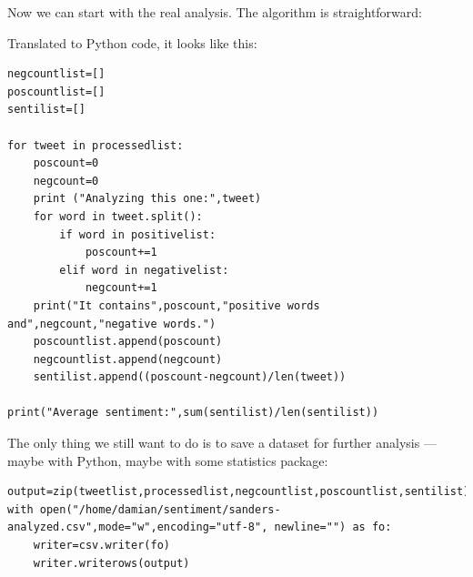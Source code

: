 \documentclass[a4paper,12pt]{book}
\newcounter{lijst}
\renewcommand{\texttt}[1]{%
  \begingroup
  \ttfamily
  \begingroup\lccode`~=`/\lowercase{\endgroup\def~}{/\discretionary{}{}{}}%
  \begingroup\lccode`~=`[\lowercase{\endgroup\def~}{[\discretionary{}{}{}}%
  \begingroup\lccode`~=`.\lowercase{\endgroup\def~}{.\discretionary{}{}{}}%
  \begingroup\lccode`~=`(\lowercase{\endgroup\def~}{(\discretionary{}{}{}}%
  \catcode`/=\active\catcode`[=\active\catcode`.=\active\catcode`(=\active
  \scantokens{#1\noexpand}%
  \endgroup
}
\begin{document}
Now we can start with the real analysis. The algorithm is straightforward:

Translated to Python code, it looks like this:

\begin{lstlisting}
negcountlist=[]
poscountlist=[]
sentilist=[]

for tweet in processedlist:
    poscount=0
    negcount=0
    print ("Analyzing this one:",tweet)
    for word in tweet.split():
        if word in positivelist:
            poscount+=1
        elif word in negativelist:
            negcount+=1        
    print("It contains",poscount,"positive words and",negcount,"negative words.")
    poscountlist.append(poscount)
    negcountlist.append(negcount)
    sentilist.append((poscount-negcount)/len(tweet))
    
print("Average sentiment:",sum(sentilist)/len(sentilist))
\end{lstlisting}

The only thing we still want to do is to save a dataset for further analysis --- maybe with Python, maybe with some statistics package:

\begin{lstlisting}
output=zip(tweetlist,processedlist,negcountlist,poscountlist,sentilist)
with open("/home/damian/sentiment/sanders-analyzed.csv",mode="w",encoding="utf-8", newline="") as fo:
    writer=csv.writer(fo)
    writer.writerows(output)
\end{lstlisting}
\end{document}
